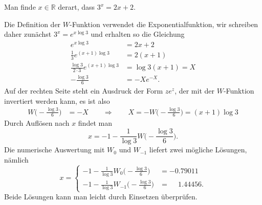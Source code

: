 Man finde $x\in\mathbb{R}$ derart, dass $3^x=2x+2$.

\begin{loesung}
Die Definition der $W$-Funktion verwendet die Exponentialfunktion,
wir schreiben daher zunächst $3^x = e^{x\log 3}$ und erhalten so
die Gleichung
\begin{align*}
e^{x\log 3} &= 2x+2
\\
\frac{1}{3}e^{(x+1)\log 3}
&=2(x+1)
\\
\frac{\log 3}{2\cdot 3}e^{(x+1)\log 3}
&=\log 3(x+1)
=
X
\\
-\frac{\log 3}{6}
&=
-Xe^{-X}.
\end{align*}
Auf der rechten Seite steht ein Ausdruck der Form $ze^z$, der mit der
$W$-Funktion invertiert werden kann, es ist also
\begin{align*}
W\biggl(
-\frac{\log 3}{6}
\biggr)
&=
-X
\qquad\Rightarrow\qquad
X=
-W\biggl(
-\frac{\log 3}{6}
\biggr)
=
(x+1)
\log 3
\end{align*}
Durch Auflösen nach $x$ findet man
\[
x
=
-1
-
\frac{1}{\log 3}
W\biggl(
-\frac{\log 3}{6}
\biggr).
\]
Die numerische Auswertung mit $W_0$ und $W_{-1}$ liefert zwei mögliche
Lösungen, nämlich
\[
x
=
\begin{cases}
\displaystyle -1-\frac{1}{\log 3} W_0\biggl(-\frac{\log 3}{6}\biggr)&=-0.79011\\
\displaystyle -1-\frac{1}{\log 3} W_{-1}\biggl(-\frac{\log 3}{6}\biggr)&=\phantom{-}1.44456.
\end{cases}
\]
Beide Lösungen kann man leicht durch Einsetzen überprüfen.
\end{loesung}
